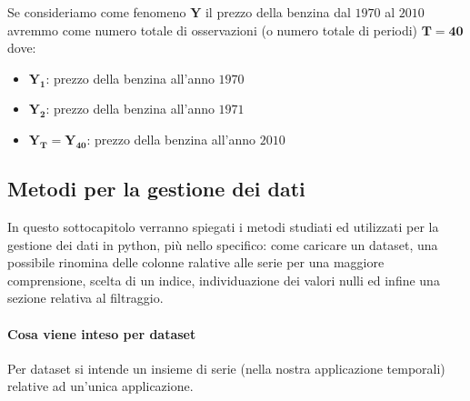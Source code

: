 \begin{esempio} 
    Se consideriamo come fenomeno $\bm{Y}$ il prezzo della benzina dal $1970$ al $2010$
    avremmo come numero totale di osservazioni (o numero totale di periodi) 
    $\bm{T} = \bm{40}$ dove:
    \begin{itemize}
        \setlength\itemsep{-0.5em}
        \item $\bm{Y_1}$: prezzo della benzina all'anno $1970$
        \item $\bm{Y_2}$: prezzo della benzina all'anno $1971$
        \item $\bm{Y_T} = \bm{Y_{40}}$: prezzo della benzina all'anno $2010$
    \end{itemize}

\end{esempio}




\subsection{Metodi per la gestione dei dati}
In questo sottocapitolo verranno spiegati i metodi studiati ed utilizzati per la gestione dei
dati in python, più nello specifico: come caricare un dataset, una possibile rinomina delle
colonne ralative alle serie per una maggiore comprensione, scelta di un indice, individuazione dei valori
nulli ed infine una sezione relativa al filtraggio.

\paragraph{Cosa viene inteso per dataset} Per dataset si intende un insieme di
serie (nella nostra applicazione temporali) relative ad un'unica applicazione.

